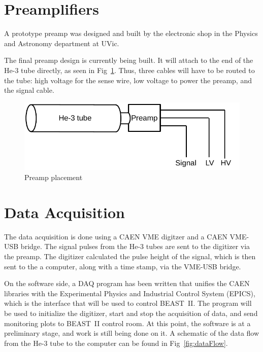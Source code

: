 \clearpage
\section{Preamplifiers}

	A prototype preamp was designed and built by the electronic shop in the Physics and Astronomy department at UVic.


	The final preamp design is currently being built. It will attach to the end of the He-3 tube directly, as seen in Fig~\ref{fig:preamp}. Thus, three cables will have to be routed to the tube: high voltage for the sense wire, low voltage to power the preamp, and the signal cable.





\begin{figure}[htb]
	\centering
	\includegraphics[width=5in]{images/preamp}
	\caption{Preamp placement}	
	\label{fig:preamp}
\end{figure}



\section{Data Acquisition}

	The data acquisition is done using a CAEN VME digitzer and a CAEN VME-USB bridge. The signal pulses from the He-3 tubes are sent to the digitizer via the preamp. The digitizer calculated the pulse height of the signal, which is then sent to the a computer, along with a time stamp, via the VME-USB bridge.

	On the software side, a DAQ program has been written that unifies the CAEN libraries with the Experimental Physics and Industrial Control System (EPICS), which is the interface that will be used to control BEAST~II. The program will be used to initialize the digitizer, start and stop the acquisition of data, and send monitoring plots to BEAST~II control room. At this point, the software is at a preliminary stage, and work is still being done on it. A schematic of the data flow from the He-3 tube to the computer can be found in Fig~\ref{fig:dataFlow}.


